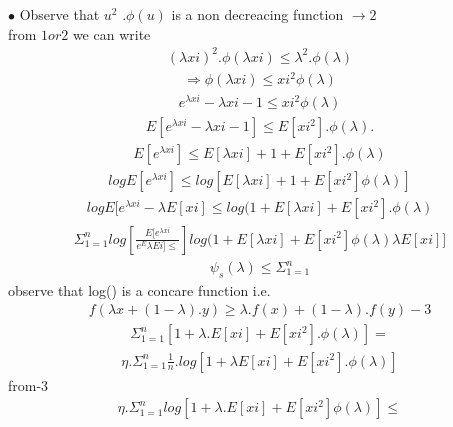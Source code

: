\documentclass[journal,12pt,twocolumn]{IEEEtran}
\begin{document}
$\bullet$ Observe that $u^2$ .$\phi(u)$ is a non decreacing function $\rightarrow 2$\\

from $1 or 2$ we can write \\
\begin{align}
(\lambda xi)^2. \phi(\lambda xi)\leqslant \lambda^2. \phi(\lambda)
\end{align}
	\begin{align}
\Rightarrow \phi(\lambda xi)\leqslant xi^2 \phi (\lambda)
\end{align}
\begin{align}
e^{\lambda xi}-\lambda xi-1 \leqslant xi^2 \phi (\lambda)
\end{align}
\begin{align}
E[e^{\lambda xi}-\lambda xi -1]\leqslant E[xi^2].\phi(\lambda).
\end{align}
\begin{align}
E[e^{\lambda xi}]\leqslant E[\lambda xi]+1+E[xi^2].\phi (\lambda)
\end{align}
\begin{align}
log E[e^{\lambda xi}]\leqslant log [E[\lambda xi]+1+E[xi^2] \phi (\lambda)]
\end{align}
\begin{align}
log E[e^{\lambda xi}- \lambda E[xi]\leqslant log(1+E[\lambda xi]+ E[xi^2].\phi (\lambda)
\end{align}
\begin{align}
\Sigma_{1=1}^{n} log [\frac{E[e^{\lambda xi}}{e^E{\lambda Ei}]\leqslant}] log (1+E[\lambda xi]+E[xi^2] \phi (\lambda) \lambda E[xi]]
\end{align}
\begin{align}
\psi_s(\lambda)\leqslant \Sigma_{1=1}^{n}
\end{align}
observe that log() is a concare function i.e.\\
\begin{align}
f(\lambda x+(1-\lambda). y) \geqslant \lambda. f(x)+(1-\lambda).f(y)-3
\end{align}
\begin{align}
\Sigma_{1=1}^{n}[1+\lambda .E[xi]+ E[xi^2].\phi (\lambda)]=
\end{align}
\begin{align}
\eta. \Sigma_{1=1}^{n} \frac{1}{n}.log [1+\lambda E[xi]+E[xi^2].\phi (\lambda)]
\end{align}
from-3
\begin{align}
\eta. \Sigma_{1=1}^{n} log[1+\lambda .E[xi]+E[xi^2]\phi (\lambda)]\leqslant
\end{align}
\end{document}
